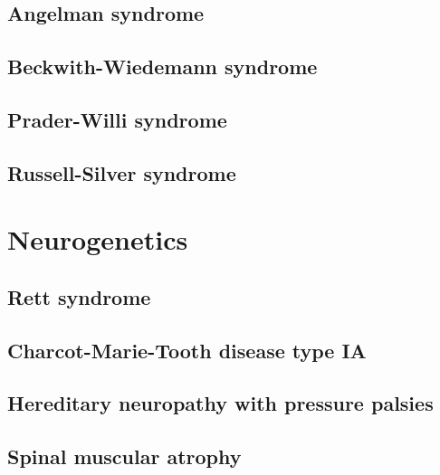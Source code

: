 \documentclass{scrartcl}
\begin{document}
\subsection{Angelman syndrome}
\label{sec:org69de8cd}
\subsection{Beckwith-Wiedemann syndrome}
\label{sec:org39b0fd7}
\subsection{Prader-Willi syndrome}
\label{sec:orgaf2bc3d}
\subsection{Russell-Silver syndrome}
\label{sec:org26f80cf}

\section{Neurogenetics}
\label{sec:orgd035b6b}
\subsection{Rett syndrome}
\label{sec:org0b62bdb}
\subsection{Charcot-Marie-Tooth disease type IA}
\label{sec:orgdec705a}
\subsection{Hereditary neuropathy with pressure palsies}
\label{sec:orge9df546}
\subsection{Spinal muscular atrophy}
\label{sec:org281f5d8}
\end{document}
